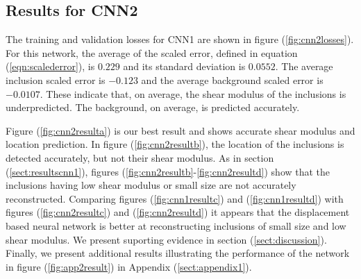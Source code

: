 \documentclass[12pt]{article}
\begin{document}
\subsection{\label{sect:resultscnn2}Results for CNN2}
The training and validation losses for CNN1 are shown in figure (\ref{fig:cnn2losses}). For this network, the average of the scaled error, defined in equation (\ref{eqn:scalederror}), is $0.229$ and its standard deviation is $0.0552$. The average inclusion scaled error is $-0.123$ and the average background scaled error is $-0.0107$. These indicate that, on average, the shear modulus of the inclusions is underpredicted. The background, on average, is predicted accurately.

Figure (\ref{fig:cnn2resulta}) is our best result and shows accurate shear modulus and location prediction. In figure (\ref{fig:cnn2resultb}), the location of the inclusions is detected accurately, but not their shear modulus. As in section (\ref{sect:resultscnn1}), figures (\ref{fig:cnn2resultb}-\ref{fig:cnn2resultd}) show that the inclusions having low shear modulus or small size are not accurately reconstructed. Comparing figures (\ref{fig:cnn1resultc}) and (\ref{fig:cnn1resultd}) with figures (\ref{fig:cnn2resultc}) and (\ref{fig:cnn2resultd}) it appears that the displacement based neural network is better at reconstructing inclusions of small size and low shear modulus. We present suporting evidence in section (\ref{sect:discussion}). Finally, we present additional results illustrating the performance of the network in figure (\ref{fig:app2result}) in Appendix (\ref{sect:appendix1}).
\end{document}

